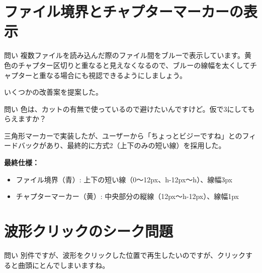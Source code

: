 \documentclass[10pt,a4paper,twocolumn]{article}
\begin{document}
\section{ファイル境界とチャプターマーカーの表示}

\begin{itembox}[l]{問い}
複数ファイルを読み込んだ際のファイル間をブルーで表示しています。黄色のチャプター区切りと重なると見えなくなるので、ブルーの線幅を太くしてチャプターと重なる場合にも視認できるようにしましょう。
\end{itembox}

いくつかの改善案を提案した。

\vspace{0.5\baselineskip}
\vspace{0.5\baselineskip}

\begin{itembox}[l]{問い}
色は、カットの有無で使っているので避けたいんですけど。仮で3にしてもらえますか？
\end{itembox}

三角形マーカーで実装したが、ユーザーから「ちょっとビジーですね」とのフィードバックがあり、最終的に方式2（上下のみの短い線）を採用した。

\textbf{最終仕様：}
\begin{itemize}
    \item ファイル境界（青）: 上下の短い線（0〜12px、h-12px〜h）、線幅3px
    \item チャプターマーカー（黄）: 中央部分の縦線（12px〜h-12px）、線幅1px
\end{itemize}

\section{波形クリックのシーク問題}

\begin{itembox}[l]{問い}
別件ですが、波形をクリックした位置で再生したいのですが、クリックすると曲頭にとんでしまいますね。
\end{itembox}
\end{document}
